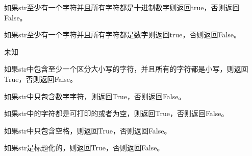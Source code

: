 \noindent{\color{red}{str.isdecimal():}}
\par{如果str至少有一个字符并且所有字符都是十进制数字则返回true，否则返回False。}\\

\noindent{\color{red}{str.isdigit():}}
\par{如果str至少有一个字符并且所有字符都是数字则返回true，否则返回False。}\\

\noindent{\color{red}{str.isidentifier():}}
\par{未知}\\

\noindent{\color{red}{str.islower():}}
\par{如果str中包含至少一个区分大小写的字符，并且所有的字符都是小写，则返回True，否则返回False。}\\

\noindent{\color{red}{str.isnumeric():}}
\par{如果str中只包含数字字符，则返回True，否则返回False。}\\

\noindent{\color{red}{str.isprintable():}}
\par{如果str中的字符都是可打印的或者为空，则返回True，否则返回False。}\\

\noindent{\color{red}{str.isspace():}}
\par{如果str中只包含空格，则返回True，否则返回False。}\\

\noindent{\color{red}{str.istitle():}}
\par{如果str是标题化的，则返回True，否则返回False。}\\


